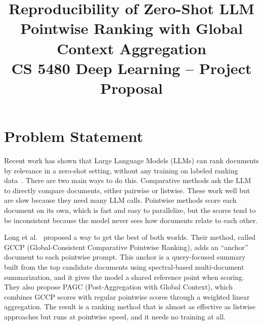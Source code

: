 \documentclass[conference]{IEEEtran}
\begin{document}
\title{Reproducibility of Zero-Shot LLM Pointwise Ranking with Global Context Aggregation\\[10pt]
\large CS 5480 Deep Learning -- Project Proposal}

\author{
}

\maketitle
\thispagestyle{plain}
\pagestyle{plain}

\section{Problem Statement}

Recent work has shown that Large Language Models (LLMs) can rank documents by relevance in a zero-shot setting, without any training on labeled ranking data~\cite{sun2023chatgpt, qin2024pairwise}. There are two main ways to do this. Comparative methods ask the LLM to directly compare documents, either pairwise or listwise. These work well but are slow because they need many LLM calls. Pointwise methods score each document on its own, which is fast and easy to parallelize, but the scores tend to be inconsistent because the model never sees how documents relate to each other.

Long et al.~\cite{long2025precise} proposed a way to get the best of both worlds. Their method, called GCCP (Global-Consistent Comparative Pointwise Ranking), adds an ``anchor'' document to each pointwise prompt. This anchor is a query-focused summary built from the top candidate documents using spectral-based multi-document summarization, and it gives the model a shared reference point when scoring. They also propose PAGC (Post-Aggregation with Global Context), which combines GCCP scores with regular pointwise scores through a weighted linear aggregation. The result is a ranking method that is almost as effective as listwise approaches but runs at pointwise speed, and it needs no training at all.
\end{document}
